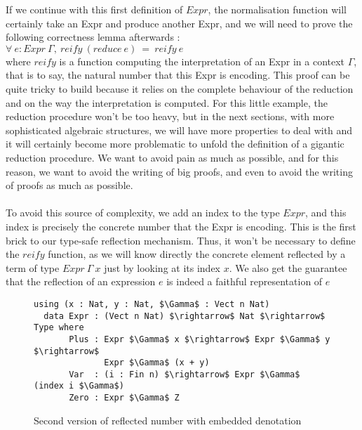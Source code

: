 If we continue with this first definition of $Expr$, the normalisation function will certainly take an Expr and produce another Expr, and we will need to prove the following correctness lemma afterwards : \\
$\forall\ e:Expr\ \Gamma,\ reify\ (reduce\ e)\ =\ reify\ e$ \\
where $reify$ is a function computing the interpretation of an Expr in a context $\Gamma$, that is to say, the natural number that this Expr is encoding.
This proof can be quite tricky to build because it relies on the complete behaviour of the reduction and on the way the interpretation is computed.
For this little example, the reduction procedure won't be too heavy, but in the next sections, with more sophisticated algebraic structures, we will have more properties to deal with and it will certainly become more problematic to unfold the definition of a gigantic reduction procedure. We want to avoid pain as much as possible, and for this reason, we want to avoid the writing of big proofs, and even to avoid the writing of proofs as much as possible. \\
\\
To avoid this source of complexity, we add an index to the type $Expr$, and this index is precisely the concrete number that the Expr is encoding. This is the first brick to our type-safe reflection mechanism. Thus, it won't be necessary to define the $reify$ function, as we will know directly the concrete element reflected by a term of type $Expr\ \Gamma\ x$ just by looking at its index $x$. We also get the guarantee that the reflection of an expression $e$ is indeed a faithful representation of $e$ \\

\begin{figure}[H]
\figrule
\begin{center}
\begin{lstlisting}
using (x : Nat, y : Nat, $\Gamma$ : Vect n Nat)
  data Expr : (Vect n Nat) $\rightarrow$ Nat $\rightarrow$ Type where
       Plus : Expr $\Gamma$ x $\rightarrow$ Expr $\Gamma$ y $\rightarrow$ 
              Expr $\Gamma$ (x + y)
       Var  : (i : Fin n) $\rightarrow$ Expr $\Gamma$ (index i $\Gamma$)
       Zero : Expr $\Gamma$ Z
\end{lstlisting}
\end{center}
\caption{Second version of reflected number with embedded denotation}
\label{reflectedNaturalNumbers}
\figrule
\end{figure}

